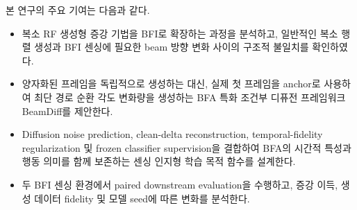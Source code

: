 본 연구의 주요 기여는 다음과 같다.

\begin{itemize}
    \item 복소 RF 생성형 증강 기법을 BFI로 확장하는 과정을 분석하고,
    일반적인 복소 행렬 생성과 BFI 센싱에 필요한 beam 방향 변화 사이의
    구조적 불일치를 확인하였다.

    \item 양자화된 프레임을 독립적으로 생성하는 대신, 실제 첫 프레임을
    anchor로 사용하여 최단 경로 순환 각도 변화량을 생성하는 BFA 특화 조건부
    디퓨전 프레임워크 BeamDiff를 제안한다.

    \item Diffusion noise prediction, clean-delta reconstruction,
    temporal-fidelity regularization 및 frozen classifier supervision을
    결합하여 BFA의 시간적 특성과 행동 의미를 함께 보존하는 센싱 인지형
    학습 목적 함수를 설계한다.

    \item 두 BFI 센싱 환경에서 paired downstream evaluation을 수행하고,
    증강 이득, 생성 데이터 fidelity 및 모델 seed에 따른 변화를 분석한다.
\end{itemize}

